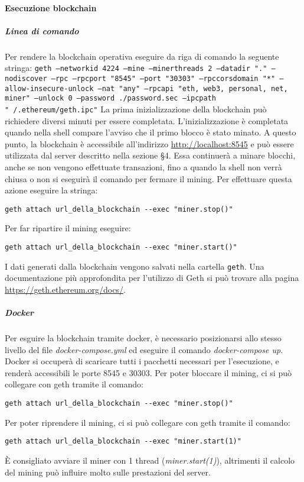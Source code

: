 \paragraph{Esecuzione blockchain}
\subparagraph{Linea di comando}
Per rendere la blockchain operativa eseguire da riga di comando la seguente stringa:\newline
\texttt{geth --networkid 4224 --mine --minerthreads 2 --datadir "." --nodiscover --rpc --rpcport "8545" --port "30303" --rpccorsdomain "*" --allow-insecure-unlock --nat "any" --rpcapi "eth, web3, personal, net, miner" --unlock 0 --password ./password.sec --ipcpath "~/.ethereum/geth.ipc"} \newline
La prima inizializzazione della blockchain può richiedere diversi minuti per essere completata. L'inizializzazione è completata quando nella shell compare l'avviso che il primo blocco è stato minato. A questo punto, la blockchain è accessibile all'indirizzo \url{http://localhost:8545} e può essere utilizzata dal server descritto nella sezione §4. Essa continuerà a minare blocchi, anche se non vengono effettuate transazioni, fino a quando la shell non verrà chiusa o non si eseguirà il comando per fermare il mining. Per effettuare questa azione eseguire la stringa: 
\begin{center}
	\texttt{geth attach url\_della\_blockchain -{}-exec "miner.stop()"}
\end{center} 
Per far ripartire il mining eseguire:
\begin{center}
	\texttt{geth attach url\_della\_blockchain -{}-exec "miner.start()"}
\end{center}
I dati generati dalla blockchain vengono salvati nella cartella \texttt{geth}. \newline
Una documentazione più approfondita per l'utilizzo di Geth si può trovare alla pagina \url{https://geth.ethereum.org/docs/}.

\subparagraph{Docker}
Per esguire la blockchain tramite docker, è necessario posizionarsi allo stesso livello del file \textit{docker-compose.yml} ed eseguire il comando \textit{docker-compose up}. Docker si occuperà di scaricare tutti i pacchetti necessari per l'esecuzione, e renderà accessibili le porte 8545 e 30303.\newline
Per poter bloccare il mining, ci si può collegare con geth tramite il comando:
\begin{center}
	\texttt{geth attach url\_della\_blockchain -{}-exec "miner.stop()"}
\end{center}
Per poter riprendere il mining, ci si può collegare con geth tramite il comando:
\begin{center}
	\texttt{geth attach url\_della\_blockchain -{}-exec "miner.start(1)"}
\end{center}
È consigliato avviare il miner con 1 thread (\textit{miner.start(1)}), altrimenti il calcolo del mining può influire molto sulle prestazioni del server.


